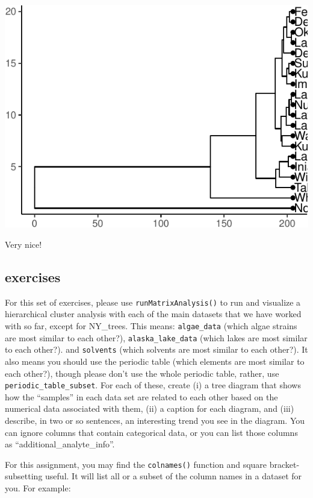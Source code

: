 \documentclass[
]{krantz}
\begin{document}
\begin{center}\includegraphics{index_files/figure-latex/unnamed-chunk-92-1} \end{center}

Very nice!

\hypertarget{exercises-3}{%
\subsection{exercises}\label{exercises-3}}

For this set of exercises, please use \texttt{runMatrixAnalysis()} to run and visualize a hierarchical cluster analysis with each of the main datasets that we have worked with so far, except for NY\_trees. This means: \texttt{algae\_data} (which algae strains are most similar to each other?), \texttt{alaska\_lake\_data} (which lakes are most similar to each other?). and \texttt{solvents} (which solvents are most similar to each other?). It also means you should use the periodic table (which elements are most similar to each other?), though please don't use the whole periodic table, rather, use \texttt{periodic\_table\_subset}. For each of these, create (i) a tree diagram that shows how the ``samples'' in each data set are related to each other based on the numerical data associated with them, (ii) a caption for each diagram, and (iii) describe, in two or so sentences, an interesting trend you see in the diagram. You can ignore columns that contain categorical data, or you can list those columns as ``additional\_analyte\_info''.

For this assignment, you may find the \texttt{colnames()} function and square bracket-subsetting useful. It will list all or a subset of the column names in a dataset for you. For example:
\end{document}
